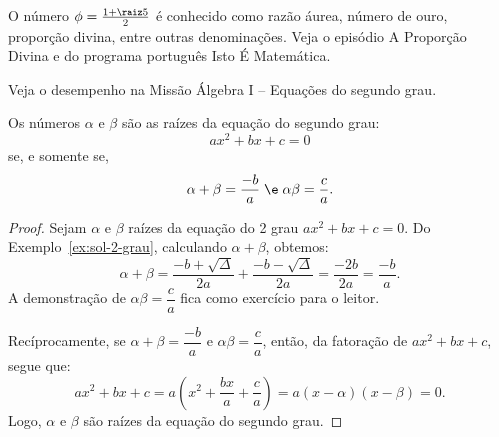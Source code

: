 \begin{remark}
    O número $\phi = \frac {1 + \raiz 5} 2$ é conhecido como razão áurea, número de ouro, proporção divina, entre outras denominações.
    Veja o episódio A Proporção Divina  e  do programa português Isto É Matemática.
\end{remark}

\begin{onlineact}
    Veja o desempenho na Missão Álgebra I -- Equações do segundo grau.
\end{onlineact}

\begin{theorem}
    Os números $\alpha$ e $\beta$ são as raízes da equação do segundo grau:
    \[
        ax^2 + bx + c = 0
    \]
    se, e somente se,
    \[
        \alpha + \beta = \dfrac {-b} a \; \e \; \alpha \beta = \dfrac c a.
    \]
\end{theorem}

\begin{proof}
    Sejam $\alpha$ e $\beta$ raízes da equação do 2\tdeg{} grau $ax^2 + bx + c = 0$. Do Exemplo~\ref{ex:sol-2-grau}, calculando $\alpha+\beta$, obtemos:
    \[
        \alpha+\beta = \dfrac{-b+\sqrt\Delta}{2a}+\dfrac{-b-\sqrt\Delta}{2a} = \dfrac{-2b}{2a}=\dfrac{-b}{a}.
    \]
    A demonstração de $\alpha\beta = \dfrac c a$ fica como exercício para o leitor.

    Recíprocamente, se $\alpha+\beta = \dfrac {-b} a$ e $\alpha\beta = \dfrac c a$, então, da fatoração de $ax^2 + bx + c$, segue que:
    \[
        ax^2 + bx + c = a(x^2 + \frac {bx} a + \frac c a) = a(x - \alpha)(x - \beta) = 0.
    \]
    Logo, $\alpha$ e $\beta$ são raízes da equação do segundo grau.
\end{proof}